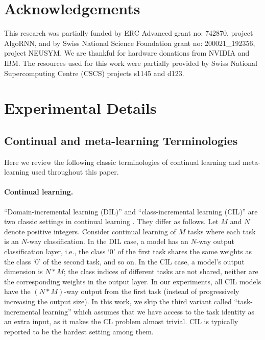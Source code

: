 \documentclass{article}
\begin{document}
\section*{Acknowledgements}
This research was partially funded by ERC Advanced grant no: 742870, project AlgoRNN,
and by Swiss National Science Foundation grant no: 200021\_192356, project NEUSYM.
We are thankful for hardware donations from NVIDIA and IBM.
The resources used for this work were partially provided by Swiss National Supercomputing Centre (CSCS) projects s1145 and d123.




\clearpage

\appendix

\section{Experimental Details}
\label{app:exp_detail}

\subsection{Continual and meta-learning Terminologies}
\label{app:jargon}
Here we review the following classic terminologies of continual learning and meta-learning used throughout this paper.

\paragraph{Continual learning.}
``Domain-incremental learning (DIL)'' and ``class-incremental learning (CIL)'' are two classic settings in continual learning \citep{van2018generative,van2019three,hsu2018re}.
They differ as follows.
Let $M$ and $N$ denote positive integers.
Consider continual learning of $M$ tasks where each task is an $N$-way classification.
In the DIL case, a model has an $N$-way output classification layer, i.e., the class `0' of the first task shares the same weights as the class `0' of the second task, and so on.
In the CIL case, a model's output dimension is $N * M$; the class indices of different tasks are not shared, neither are the corresponding weights in the output layer.
In our experiments, all CIL models have the $(N * M)$-way output from the first task (instead of progressively increasing the output size).
In this work, we skip the third variant called ``task-incremental learning'' which assumes that we have 
access to the task identity as an extra input, as it makes the CL problem almost trivial.
CIL is typically reported to be the hardest setting among them.
\end{document}
